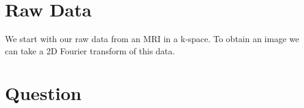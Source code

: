 \documentclass{article}
\begin{document}
\section{Raw Data}
We start with our raw data from an MRI in a k-space. To obtain an image we can take a 2D Fourier transform of this data. 
\section{Question}
\end{document}

